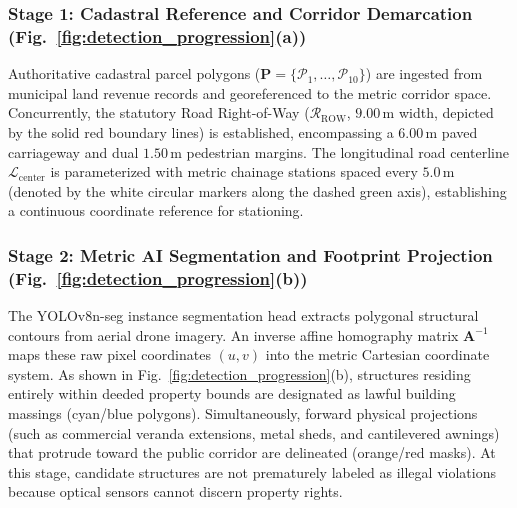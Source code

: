\documentclass[conference]{IEEEtran}
\begin{document}
\subsubsection{Stage 1: Cadastral Reference and Corridor Demarcation (Fig.~\ref{fig:detection_progression}(a))}
Authoritative cadastral parcel polygons ($\mathbf{P} = \{\mathcal{P}_1, \dots, \mathcal{P}_{10}\}$) are ingested from municipal land revenue records and georeferenced to the metric corridor space. Concurrently, the statutory Road Right-of-Way ($\mathcal{R}_{\text{ROW}}$, $9.00\,\text{m}$ width, depicted by the solid red boundary lines) is established, encompassing a $6.00\,\text{m}$ paved carriageway and dual $1.50\,\text{m}$ pedestrian margins. The longitudinal road centerline $\mathcal{L}_{\text{center}}$ is parameterized with metric chainage stations spaced every $5.0\,\text{m}$ (denoted by the white circular markers along the dashed green axis), establishing a continuous coordinate reference for stationing.

\subsubsection{Stage 2: Metric AI Segmentation and Footprint Projection (Fig.~\ref{fig:detection_progression}(b))}
The YOLOv8n-seg instance segmentation head extracts polygonal structural contours from aerial drone imagery. An inverse affine homography matrix $\mathbf{A}^{-1}$ maps these raw pixel coordinates $(u, v)$ into the metric Cartesian coordinate system. As shown in Fig.~\ref{fig:detection_progression}(b), structures residing entirely within deeded property bounds are designated as lawful building massings (cyan/blue polygons). Simultaneously, forward physical projections (such as commercial veranda extensions, metal sheds, and cantilevered awnings) that protrude toward the public corridor are delineated (orange/red masks). At this stage, candidate structures are not prematurely labeled as illegal violations because optical sensors cannot discern property rights.
\end{document}
